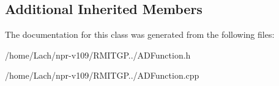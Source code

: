 \subsection*{Additional Inherited Members}


The documentation for this class was generated from the following files\+:\begin{DoxyCompactItemize}
\item 
/home/\+Lach/npr-\/v109/\+R\+M\+I\+T\+G\+P../A\+D\+Function.\+h\item 
/home/\+Lach/npr-\/v109/\+R\+M\+I\+T\+G\+P../A\+D\+Function.\+cpp\end{DoxyCompactItemize}
